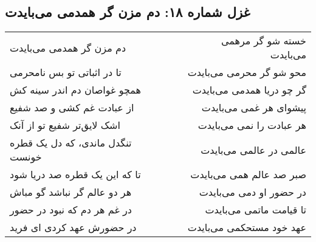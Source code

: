\begin{center}
\section*{غزل شماره ۱۸: دم مزن گر همدمی می‌بایدت}
\label{sec:018}
\begin{longtable}{l p{0.5cm} r}
دم مزن گر همدمی می‌بایدت
&&
خسته شو گر مرهمی می‌بایدت
\\
تا در اثباتی تو بس نامحرمی
&&
محو شو گر محرمی می‌بایدت
\\
همچو غواصان دم اندر سینه کش
&&
گر چو دریا همدمی می‌بایدت
\\
از عبادت غم کشی و صد شفیع
&&
پیشوای هر غمی می‌بایدت
\\
اشک لایق‌تر شفیع تو از آنک
&&
هر عبادت را نمی می‌بایدت
\\
تنگدل ماندی، که دل یک قطره خونست
&&
عالمی در عالمی می‌بایدت
\\
تا که این یک قطره صد دریا شود
&&
صبر صد عالم همی می‌بایدت
\\
هر دو عالم گر نباشد گو مباش
&&
در حضور او دمی می‌بایدت
\\
در غم هر دم که نبود در حضور
&&
تا قیامت ماتمی می‌بایدت
\\
در حضورش عهد کردی ای فرید
&&
عهد خود مستحکمی می‌بایدت
\\
\end{longtable}
\end{center}
